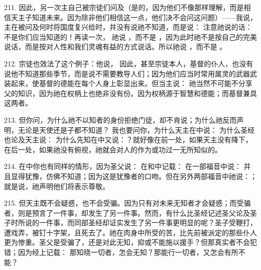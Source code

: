 211. 因此，另一次主自己被宗徒们问及（是的，因为他们不像那样理解，而是相信天主子知道未来。因为除非他们相信这一点，他们决不会问这问题）——我说，主在被问及何时将国度复兴给时，并没有说祂不知道，而是说： 注意祂说的话：不是你们应当知道的！再读一次， 祂说 ，而不是 ，因为此时祂不是按自己的完美说话，而是按对人性和我们灵魂有益的方式说话。所以祂说 ，而不是 。\par

212. 宗徒也效法了这个例子：他说， 因此，甚至宗徒本人，基督的仆人，也没有说他不知道那些季节，而是说不需要教导人们；因为他们应当时常用属灵的武器武装起来，使基督的德能在每个人身上彰显出来。但当主说： 祂当然不可能不分享父的知识，因为祂在权柄上也绝非没有份。因为权柄源于智慧和德能；而基督兼具这两者。\par

213. 但你问，为什么祂不以知者的身份拒绝门徒，却不肯说；为什么祂反而声明，无论是天使还是子都不知道？ 我也要问你，为什么天主在中说： 为什么圣经也论及天主说： 为什么先知在中又说：？就好像在前一处，如果天主没有降下，在后一处，如果祂没有俯视，祂就会对人的作为或功过一无所知似的。\par

214. 在中你也有同样的情形，因为圣父说： 在和中记载： 在一部福音中说： 并且显得犹豫，仿佛不知道；因为这是犹豫者的口吻。但在另外两部福音中祂说：； 就是说，祂声明他们将表示尊敬。\par

215. 但天主既不会疑惑，也不会受骗。因为只有对未来无知者才会疑惑；而受骗者，则是预言了一件事，却发生了另一件事。然而，有什么比圣经记述圣父论及圣子时所说的一件事，而同部圣经却证实发生了另一件事更明显的呢？圣子受鞭打，遭戏弄，被钉十字架，且死去了。祂在肉身中所受的苦，比先前被派定的那些仆人更为惨重。圣父是受骗了，还是对此无知，抑或不能施以援手？但那真实者不会犯错；因为经上记载：  那知晓一切者，怎会无知？那能行一切者，又怎会有所不能？\par

